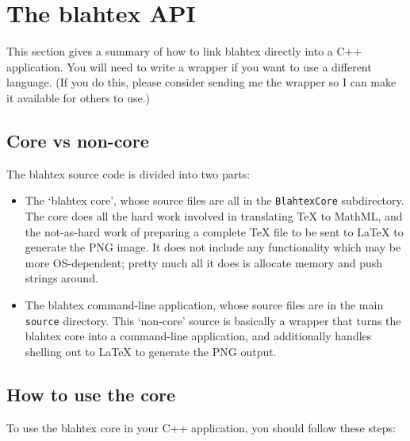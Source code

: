 \documentclass{article}
\begin{document}
\section{The blahtex API}\label{sec:API}

This section gives a summary of how to link blahtex directly into a C++ application. You will need to write a wrapper if you want to use a different language. (If you do this, please consider sending me the wrapper so I can make it available for others to use.)

\subsection{Core vs non-core}

The blahtex source code is divided into two parts:
\begin{itemize}
\item The `blahtex core', whose source files are all in the \texttt{BlahtexCore} subdirectory. The core does all the hard work involved in translating \TeX{} to MathML, and the not-as-hard work of preparing a complete \TeX{} file to be sent to \LaTeX{} to generate the PNG image. It does not include any functionality which may be more OS-dependent; pretty much all it does is allocate memory and push strings around. 
\item The blahtex command-line application, whose source files are in the main \texttt{source} directory. This `non-core' source is basically a wrapper that turns the blahtex core into a command-line application, and additionally handles shelling out to \LaTeX{} to generate the PNG output.
\end{itemize}


\subsection{How to use the core}

To use the blahtex core in your C++ application, you should follow these steps:
\end{document}
